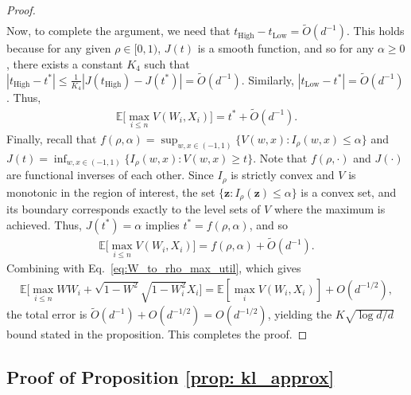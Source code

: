 \documentclass[12pt]{article}
\theoremstyle{definition}
\theoremstyle{remark}
\begin{document}
\begin{proof}
\begin{align*}
\end{align*}
Now, to complete the argument, we need that $t_{\text{High}} - t_{\text{Low}} = \tilde O(d^{-1})$. This holds because for any given $\rho \in [0,1)$, $J(t)$ is a smooth function, and so for any $\alpha\geq 0$, there exists a constant $K_4$ such that $|t_{\text{High}} - t^*| \leq \frac{1}{K_4} |J(t_{\text{High}}) - J(t^*)| = \tilde O(d^{-1})$. Similarly, $|t_{\text{Low}} - t^*| = \tilde O(d^{-1})$. Thus,
\begin{align*}
    \mathbb E \Big[\max_{i\leq n} V(W_i,X_i)\Big] = t^* + \tilde O(d^{-1}).
\end{align*}
Finally, recall that $f(\rho, \alpha) = \sup_{w,x \in (-1,1)} \{ V(w, x) : I_\rho(w, x) \leq \alpha \}$ and $J(t) = \inf_{w,x \in (-1,1)} \{I_\rho(w, x) : V(w, x) \geq t \}$. Note that $f(\rho, \cdot)$ and $J(\cdot)$ are functional inverses of each other. Since $I_\rho$ is strictly convex and $V$ is monotonic in the region of interest, the set $\{ \mathbf{z} : I_\rho(\mathbf{z}) \leq \alpha \}$ is a convex set, and its boundary corresponds exactly to the level sets of $V$ where the maximum is achieved. Thus, $J(t^*) = \alpha$ implies $t^* = f(\rho, \alpha)$, and so
\begin{align*}
    \mathbb E \Big[\max_{i\leq n} V(W_i,X_i)\Big] = f(\rho, \alpha) + \tilde O(d^{-1}).
\end{align*}
Combining with Eq.~\eqref{eq:W_to_rho_max_util}, which gives
\begin{align*}
    \mathbb E \Big[\max_{i\leq n} WW_i + \sqrt{1-W^2} \sqrt{1-W_i^2} X_i\Big] = \mathbb{E}[\max_i V(W_i,X_i)] + O(d^{-1/2}),
\end{align*}
the total error is $\tilde O(d^{-1}) + O(d^{-1/2}) = O(d^{-1/2})$, yielding the $K\sqrt{\log d / d}$ bound stated in the proposition. This completes the proof.

\end{proof}

\subsection{Proof of Proposition \ref{prop: kl_approx}}
\end{document}
